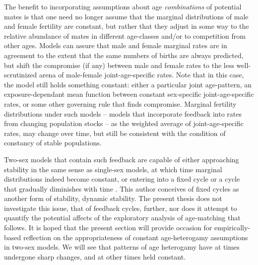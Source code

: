 The benefit to incorporating assumptions about age \textit{combinations} of
potential mates is that one need no longer assume that the marginal
distributions of male and female fertility are constant, but rather that
they adjust in some way to the relative abundance of mates in different
age-classes and/or to competition from other ages. Models can assure
that male and female marginal rates are in agreement to the extent that 
the same numbers of births are always predicted, but shift the
compromise (if any) between male and female rates to the less well-scrutinized
arena of male-female joint-age-specific rates. Note that in this case, the model
still holds something constant: either a particular joint age-pattern, an
exposure-dependant mean function between constant sex-specific joint-age-specific rates, or some
other governing rule that finds compromise. Marginal fertility distributions 
under such models -- models that
incorporate feedback into rates from changing population stocks -- as the
weighted average of joint-age-specific rates, may change over time, but still 
be consistent with the condition of constancy of stable populations.

Two-sex models that contain such feedback are capable of either approaching
stability in the same sense as single-sex models, at which time marginal
distributions indeed become constant, or entering into a fixed
cycle or a cycle that gradually diminishes with time \citep{chung1994cycles}.
This author conceives of fixed cycles as another form of stability, dynamic 
stability. The present thesis does not investigate 
this issue, that of feedback cycles, further, nor does it attempt to
quantify the potential affects of the exploratory analysis of age-matching that
follows. It is hoped that the present section will provide
occasion for empirically-based reflection on the appropriateness of
constant age-heterogamy assumptions in two-sex models. We will see that patterns
of age heterogamy have at times undergone sharp changes, and at other times
held constant.


